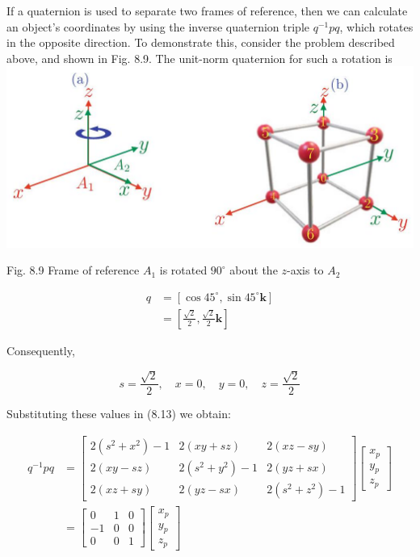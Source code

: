 \documentclass[10pt]{article}
\begin{document}
If a quaternion is used to separate two frames of reference, then we can calculate an object's coordinates by using the inverse quaternion triple $q^{-1} p q$, which rotates in the opposite direction. To demonstrate this, consider the problem described above, and shown in Fig. 8.9. The unit-norm quaternion for such a rotation is
\includegraphics[max width=\textwidth, center]{2023_04_20_41f1ceac5a31dc7d1b59g-162}

Fig. 8.9 Frame of reference $A_{1}$ is rotated $90^{\circ}$ about the $z$-axis to $A_{2}$

$$
\begin{aligned}
q & =\left[\cos 45^{\circ}, \sin 45^{\circ} \mathbf{k}\right] \\
& =\left[\frac{\sqrt{2}}{2}, \frac{\sqrt{2}}{2} \mathbf{k}\right]
\end{aligned}
$$

Consequently,

$$
s=\frac{\sqrt{2}}{2}, \quad x=0, \quad y=0, \quad z=\frac{\sqrt{2}}{2}
$$

Substituting these values in (8.13) we obtain:

$$
\begin{aligned}
q^{-1} p q & =\left[\begin{array}{ccc}
2\left(s^{2}+x^{2}\right)-1 & 2(x y+s z) & 2(x z-s y) \\
2(x y-s z) & 2\left(s^{2}+y^{2}\right)-1 & 2(y z+s x) \\
2(x z+s y) & 2(y z-s x) & 2\left(s^{2}+z^{2}\right)-1
\end{array}\right]\left[\begin{array}{l}
x_{p} \\
y_{p} \\
z_{p}
\end{array}\right] \\
& =\left[\begin{array}{ccc}
0 & 1 & 0 \\
-1 & 0 & 0 \\
0 & 0 & 1
\end{array}\right]\left[\begin{array}{l}
x_{p} \\
y_{p} \\
z_{p}
\end{array}\right]
\end{aligned}
$$
\end{document}
